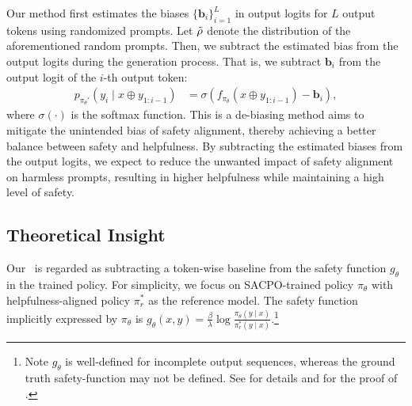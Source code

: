 Our method first estimates the biases $\{\mathbf{b}_{i}\}_{i=1}^L$ in output logits for $L$ output tokens using randomized prompts. 
Let $\tilde{\rho}$ denote the distribution of the aforementioned random prompts.
Then, we subtract the estimated bias from the output logits during the generation process. That is, we subtract $\mathbf{b}_i$ from the output logit of the $i$-th output token:
%
\begin{align}
    p_{\pi_\theta'}(y_i \mid x \oplus y_{1:i-1}) &= \sigma(f_{\pi_\theta}(x \oplus y_{1:i-1}) - \mathbf{b}_{i}),
    \label{eq:todet}
\end{align}
%
where $\sigma(\cdot)$ is the softmax function.
This is a de-biasing method aims to mitigate the unintended bias of safety alignment, thereby achieving a better balance between safety and helpfulness. By subtracting the estimated biases from the output logits, we expect to reduce the unwanted impact of safety alignment on harmless prompts, resulting in higher helpfulness while maintaining a high level of safety.

\subsection{Theoretical Insight}

Our \algoshort~is regarded as subtracting a token-wise baseline from the safety function $g_\theta$ in the trained policy. 
For simplicity, we focus on SACPO-trained policy $\pi_\theta$ with helpfulness-aligned policy $\pi_r^*$ as the reference model.
The safety function implicitly expressed by $\pi_\theta$ is $g_\theta(x, y) = \frac{\beta}{\lambda} \log \frac{\pi_\theta(y \mid x)}{\pi_r^*(y \mid x)}$.\footnote{
Note $g_{\theta}$ is well-defined for incomplete output sequences, whereas the ground truth safety-function may not be defined. See  for details and for the proof of .
}

